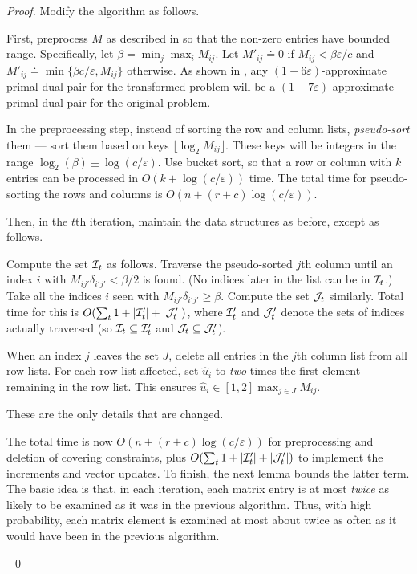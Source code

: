 \documentclass[11pt]{svjour3} \usepackage{fullpage}
\newcommand{\dualOf}[1]{{\hat{#1}}}
\newcommand{\MM}{M}
\newcommand{\JJ}{J}
\newcommand{\Ip}{\calI}
\newcommand{\wwd}{\dualOf u}
\newcommand{\Jd}{\calJ}
\newcommand{\dd}{\delta}
\newenvironment{Proof}{\begin{proof}}{{} ~\hfill\hfill\qed~\end{proof}}
\newcommand{\eps}{\varepsilon}
\newcommand{\calI}{{\cal I}}
\newcommand{\calJ}{{\cal J}}
\newcommand{\rows}{r}
\newcommand{\columns}{c}
\newcommand{\inputsize}{n}
\begin{document}
\begin{Proof}
Modify the algorithm as follows.

First, preprocess $\MM$ as described in \cite[\S2.1]{Luby93Parallel}
so that the non-zero entries have bounded range.
Specifically, 
let $\beta=\min_j\max_i \MM_{ij}$. 
Let $\MM'_{ij} \doteq 0$ if $\MM_{ij} < \beta \eps/\columns$
and $\MM'_{ij} \doteq \min\{\beta \columns/\eps,\MM_{ij}\}$ otherwise.
As shown in \cite{Luby93Parallel},
any $(1-6\eps)$-approximate primal-dual pair for the transformed problem
will be a $(1-7\eps)$-approximate primal-dual pair for the original problem.

In the preprocessing step, instead of sorting the row and column lists,
{\em pseudo-sort} them --- sort them based on keys
$\lfloor \log_2 \MM_{ij}\rfloor$.  
These keys will be integers in the range
$\log_2(\beta)\pm \log(\columns/\eps)$.  
Use bucket sort, so that a row or column with $k$ entries
can be processed in $O(k+\log(\columns/\eps))$ time.  
The total time for pseudo-sorting the rows and columns is
$O(\inputsize +(\rows+\columns)\log(\columns/\eps))$.

Then, in the $t$th iteration, maintain the data structures as before, 
except as follows.

Compute the set $\Ip_t$ as follows.
Traverse the pseudo-sorted $j$th column
until an index $i$ with $\MM_{ij'}\dd_{i'j'} < \beta/2$ is found.
(No indices later in the list can be in $\Ip_t$.)
Take all the indices $i$ seen with $\MM_{ij'}\dd_{i'j'} \ge \beta$.
Compute the set $\Jd_t$ similarly.
Total time for this is 
$O(\sum_t 1+ |\Ip'_t| + |\Jd'_t|)$,
where $\Ip'_t$ and $\Jd'_t$
denote the sets of indices actually traversed
(so $\Ip_t\subseteq\Ip'_t$
and $\Jd_t\subseteq\Jd'_t$).

When an index $j$ leaves the set $\JJ$,
delete all entries in the $j$th column list from all row lists.
For each row list affected, set $\wwd_{i}$ 
to {\em two} times the first element remaining in the row list.
This ensures  $\wwd_{i} \in [1,2]\max_{j\in\JJ}\MM_{ij}$.

These are the only details that are changed.  

The total time is now
$O(\inputsize + (\rows+\columns)\log(\columns/\eps))$ for preprocessing and deletion of covering constraints,
plus $O(\sum_t 1+|\Ip'_t| + |\Jd'_t|)$ to implement the increments and vector updates.
To finish, the next lemma bounds the latter term.
The basic idea is that, in each iteration,
each matrix entry is at most {\em twice} as likely to be examined
as it was in the previous algorithm.
Thus, with high probability, 
each matrix element is examined at most about twice as often
as it would have been in the previous algorithm.


\end{Proof}
\end{document}

